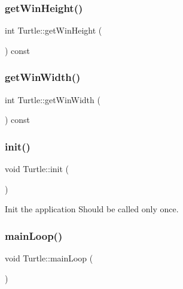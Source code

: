 \subsubsection{\texorpdfstring{get\+Win\+Height()}{getWinHeight()}}
{\footnotesize\ttfamily int Turtle\+::get\+Win\+Height (\begin{DoxyParamCaption}{ }\end{DoxyParamCaption}) const}

\mbox{\label{classTurtle_a9e8f4f0b3abafac7b89b118bef6fcaa3}} 
\subsubsection{\texorpdfstring{get\+Win\+Width()}{getWinWidth()}}
{\footnotesize\ttfamily int Turtle\+::get\+Win\+Width (\begin{DoxyParamCaption}{ }\end{DoxyParamCaption}) const}

\mbox{\label{classTurtle_a3c5a8cc7cc5a16b3ffb2be0c24eda79c}} 
\subsubsection{\texorpdfstring{init()}{init()}}
{\footnotesize\ttfamily void Turtle\+::init (\begin{DoxyParamCaption}{ }\end{DoxyParamCaption})}



Init the application Should be called only once. 

\mbox{\label{classTurtle_a7f687dce15334de9dbc475ce4869b6c8}} 
\subsubsection{\texorpdfstring{main\+Loop()}{mainLoop()}}
{\footnotesize\ttfamily void Turtle\+::main\+Loop (\begin{DoxyParamCaption}{ }\end{DoxyParamCaption})}



